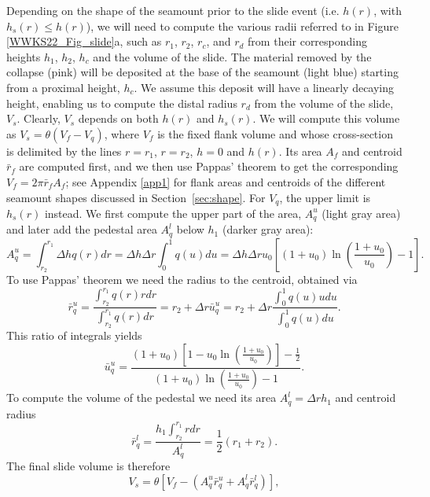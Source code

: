 Depending on the shape of the seamount prior to the slide event (i.e. $h(r)$, with $h_s(r) \le h(r)$), we will
need to compute the various radii referred to in Figure \ref{WWKS22_Fig_slide}a, such as $r_1$, $r_2$, $r_c$, and $r_d$
from their corresponding heights $h_1$, $h_2$, $h_c$ and the volume of the slide. The material removed by the collapse (pink)
will be deposited at the base of the seamount (light blue) starting from a proximal height, $h_c$.  We assume this
deposit will have a linearly decaying height, enabling us to compute the distal radius $r_d$ from the volume of the slide,
$V_s$.  Clearly, $V_s$ depends on both $h(r)$ and $h_s(r)$.  We will compute this volume as $V_s = \theta (V_f - V_q)$, where $V_f$
is the fixed flank volume and whose cross-section is delimited by the lines $r = r_1$, $r = r_2$, $h = 0$ and $h(r)$.  Its area $A_f$ and
centroid $\bar{r}_f$ are computed first, and we then use Pappas' theorem to get the corresponding $V_f = 2\pi\bar{r}_f A_f$;
see Appendix \ref{app1} for flank areas and centroids of the different seamount shapes discussed in
Section~\ref{sec:shape}.  For $V_q$, the upper limit is $h_s(r)$ instead. We first compute the upper part of the area,
$A^u_q$ (light gray area) and later add the pedestal area $A^l_q$ below $h_1$ (darker gray area):
\begin{equation*}
A^u_q = \int_{r_2}^{r_1} \Delta h q(r) dr = \Delta h \Delta r \int_0^1 q(u) du = \Delta h \Delta r u_0 \left [ (1 + u_0) \ln \left (\frac{1 + u_0}{u_0} \right ) - 1 \right ].
\end{equation*}
To use Pappas' theorem we need the radius to the centroid, obtained via
\begin{equation*}
\bar{r}^u_q = \frac{\int_{r_2}^{r_1}q(r)rdr}{\int_{r_2}^{r_1}q(r)dr} = r_2 + \Delta r \bar{u}_q^u = r_2 + \Delta r \frac{\int_0^1q(u)udu}{\int_0^1 q(u)du}.
\end{equation*}
This ratio of integrals yields
\begin{equation*}
\bar{u}^u_q = \frac{(1 + u_0)\left [1 - u_0 \ln \left ( \frac{1+u_0}{u_0} \right ) \right ] - \frac{1}{2}}{(1 + u_0) \ln \left (\frac{1 + u_0}{u_0} \right ) - 1}.
\end{equation*}
To compute the volume of the pedestal we need its area $A^l_q = \Delta r h_1$ and centroid radius
\begin{equation*}
\bar{r}^l_q = \frac{ h_1\int_{r_2}^{r_1} rdr}{A^l_q} = \frac{1}{2} (r_1 + r_2).
\end{equation*}
The final slide volume is therefore
\begin{equation*}
V_s = \theta \left [ V_f - \left (A^u_q \bar{r}^u_q + A^l_q \bar{r}^l_q \right ) \right ],
\end{equation*}
